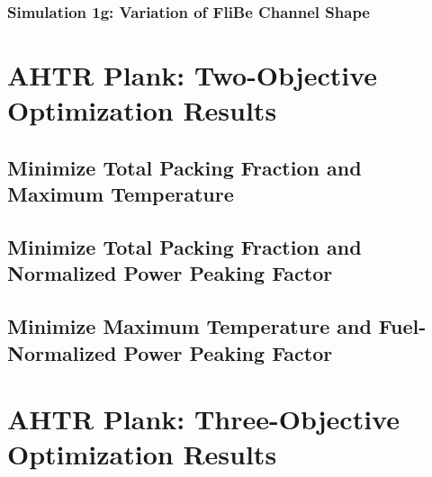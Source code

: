 \subsubsection{Simulation 1g: Variation of FliBe Channel Shape}

\section{AHTR Plank: Two-Objective Optimization Results}

\subsection{Minimize Total Packing Fraction and Maximum Temperature}

\subsection{Minimize Total Packing Fraction and Normalized Power Peaking Factor}

\subsection{Minimize Maximum Temperature and Fuel-Normalized Power Peaking Factor}

\section{AHTR Plank: Three-Objective Optimization Results}
